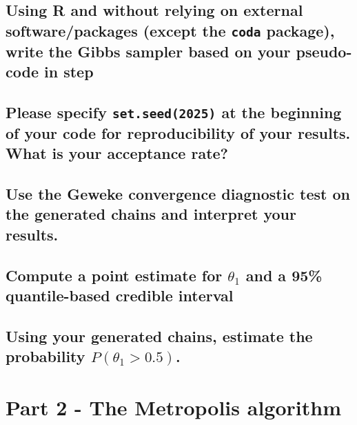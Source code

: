 \documentclass[12pt]{article}
\begin{document}
\subsection{Using R and without relying on external software/packages (except the \texttt{coda} package), write the Gibbs sampler based on your pseudo-code in step }

\subsection{Please specify \texttt{set.seed(2025)} at the beginning of your code for reproducibility of your results. What is your acceptance rate?}

\subsection{Use the Geweke convergence diagnostic test on the generated chains and interpret your results.}

\subsection{Compute a point estimate for $\theta_1$ and a 95\% quantile-based credible interval}

\subsection{Using your generated chains, estimate the probability $P(\theta_1 > 0.5)$.}



\section{Part 2 - The Metropolis algorithm}
\end{document}
